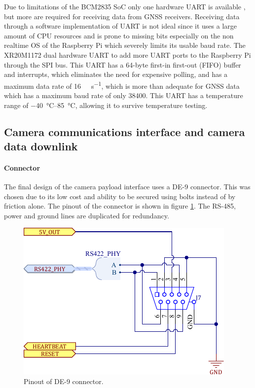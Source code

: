 \documentclass{report}
\begin{document}
Due to limitations of the BCM2835 SoC only one hardware UART is available \cite{upton2016raspberry}, but more are required for receiving data from GNSS receivers. Receiving data through a software implementation of UART is not ideal since it uses a large amount of CPU resources and is prone to missing bits especially on the non realtime OS of the Raspberry Pi which severely limits its usable baud rate. The XR20M1172 dual hardware UART to add more UART ports to the Raspberry Pi through the SPI bus. This UART has a 64-byte first-in first-out (FIFO) buffer and interrupts, which eliminates the need for expensive polling, and has a maximum data rate of \SI{16}{\mega\bit\per\second}, which is more than adequate for GNSS data \cite{maxlinear2022xr20m1172} which has a maximum baud rate of only \SI{38400}{\baud}. This UART has a temperature range of \SIrange{-40}{85}{\degreeCelsius}, allowing it to survive temperature testing.


\subsection{Camera communications interface and camera data downlink}

\paragraph{Connector}
The final design of the camera payload interface uses a DE-9 connector. This was chosen due to its low cost and ability to be secured using bolts instead of by friction alone. The pinout of the connector is shown in figure \ref{fig:de-9-connector}. The RS-485, power and ground lines are duplicated for redundancy.

\begin{figure}[H]
  \centering
  \includegraphics[width=\linewidth]{images/de-9-connector.pdf}
  \caption{Pinout of DE-9 connector.}
  \label{fig:de-9-connector}
\end{figure}
\end{document}
